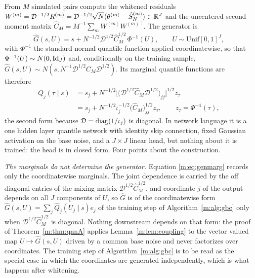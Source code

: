 \begin{definition}\label{m:def:gen}
From $M$ simulated pairs compute the whitened residuals $W^{(m)}=\mathcal D^{-1/2}R^{(m)}=\mathcal D^{-1/2}\sqrt N(\theta^{(m)}-\hat S^{(m)}_N)\in\mathbb{R}^J$ and the uncentered second moment matrix $\hat C_M=M^{-1}\sum_mW^{(m)}W^{(m)\top}$. The generator is
\[
\widehat G(s,U)=s+N^{-1/2}\mathcal D^{1/2}\hat C_M^{1/2}\,\Phi^{-1}(U),\qquad U\sim\mathrm{Unif}[0,1]^J,
\]
with $\Phi^{-1}$ the standard normal quantile function applied coordinatewise, so that $\Phi^{-1}(U)\sim N(0,\operatorname{Id}_J)$ and, conditionally on the training sample, $\widehat G(s,U)\sim N(s,N^{-1}\mathcal D^{1/2}\hat C_M\mathcal D^{1/2})$. Its marginal quantile functions are therefore
\begin{equation}\label{m:eq:genmarg}
\begin{aligned}
Q_j(\tau\mid s)&=s_j+N^{-1/2}\Big[\big(\mathcal D^{1/2}\hat C_M\mathcal D^{1/2}\big)_{jj}\Big]^{1/2}z_\tau\\
&=s_j+N^{-1/2}\iota_j^{-1/2}\big(\hat C_M\big)_{jj}^{1/2}z_\tau,\qquad z_\tau=\Phi^{-1}(\tau),
\end{aligned}
\end{equation}
the second form because $\mathcal D=\operatorname{diag}(1/\iota_j)$ is diagonal. In network language it is a one hidden layer quantile network with identity skip connection, fixed Gaussian activation on the base noise, and a $J\times J$ linear head, but nothing about it is trained: the head is in closed form. Four points about the construction.

\emph{The marginals do not determine the generator.} Equation \eqref{m:eq:genmarg} records only the coordinatewise marginals. The joint dependence is carried by the off diagonal entries of the mixing matrix $\mathcal D^{1/2}\hat C_M^{1/2}$, and coordinate $j$ of the output depends on all $J$ components of $U$, so $\widehat G$ is of the coordinatewise form $\widehat G(s,U)=\sum_j\widehat Q_j(U_j\mid s)e_j$ of the training step of Algorithm~\ref{m:alg:gbc} only when $\mathcal D^{1/2}\hat C_M^{1/2}$ is diagonal. Nothing downstream depends on that form: the proof of Theorem~\ref{m:thm:qnnA} applies Lemma~\ref{m:lem:coupling} to the vector valued map $U\mapsto\widehat G(s,U)$ driven by a common base noise and never factorizes over coordinates. The training step of Algorithm~\ref{m:alg:gbc} is to be read as the special case in which the coordinates are generated independently, which is what happens after whitening.


\end{definition}
